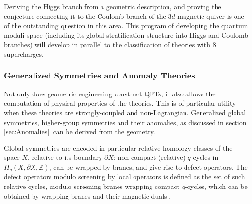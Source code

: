\documentclass[12pt]{article}
\begin{document}
Deriving the Higgs branch from a geometric description, and proving the conjecture connecting it to the Coulomb branch of the $3d$ magnetic quiver is one of the outstanding question in this area. This program of developing the quantum moduli space (including its global stratification structure into Higgs and Coulomb branches) will develop in parallel to the classification of theories with 8 supercharges. 


\subsubsection{Generalized Symmetries and Anomaly Theories}

Not only does geometric engineering construct QFTs, it also allows the computation of physical properties of the theories. 
This is of particular utility when these theories are strongly-coupled and non-Lagrangian. Generalized global symmetries, higher-group symmetries and their anomalies, as discussed in section \ref{sec:Anomalies}, can be derived from the geometry. 

Global symmetries are encoded in particular relative homology classes of the space $X$, relative to its boundary $\partial X$: non-compact (relative) $q$-cycles in $H_{q} (X, \partial X, \mathbb{Z})$, can be wrapped by branes, and give rise to defect operators. 
The defect operators modulo screening by local operators  is defined as the set of such relative cycles, modulo screening branes wrapping compact $q$-cycles, which can be obtained by wrapping branes and their magnetic duals \cite{Morrison:2020ool, GarciaEtxebarria:2019caf, Bhardwaj:2020phs, Albertini:2020mdx, Apruzzi:2021mlh,  Cvetic:2021sxm, Hubner:2022kxr, DelZotto:2022fnw, Cvetic:2022imb, DelZotto:2022joo}. 
\end{document}
